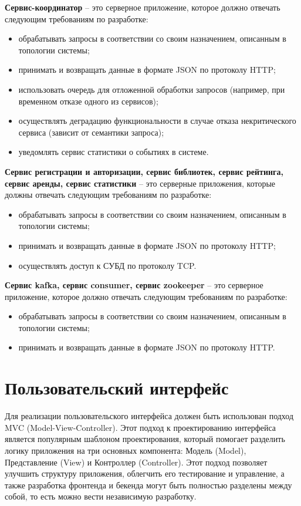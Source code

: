 \textbf{Сервис-координатор} -- это серверное приложение, которое должно отвечать следующим требованиям по разработке:
  \begin{itemize}
    \item обрабатывать запросы в соответствии со своим назначением, описанным в топологии системы;
    \item принимать и возвращать данные в формате JSON по протоколу HTTP;
    \item использовать очередь для отложенной обработки запросов (например, при временном отказе одного из сервисов);
    \item осуществлять деградацию функциональности в случае отказа некритического сервиса (зависит от семантики запроса);
    \item уведомлять сервис статистики о событиях в системе.
  \end{itemize}

 \textbf{Сервис регистрации и авторизации, сервис библиотек, сервис рейтинга, сервис аренды, сервис статистики} -- это серверные приложения, которые должны отвечать следующим требованиям по разработке:
  \begin{itemize}
    \item обрабатывать запросы в соответствии со своим назначением, описанным в топологии системы;
    \item принимать и возвращать данные в формате JSON по протоколу HTTP;
    \item осуществлять доступ к СУБД по протоколу TCP.
  \end{itemize}

\textbf{Сервис kafka, сервис consumer, сервис zookeeper} -- это серверное приложение, которое должно отвечать следующим требованиям по разработке:
  \begin{itemize}
    \item обрабатывать запросы в соответствии со своим назначением, описанным в топологии системы;
    \item принимать и возвращать данные в формате JSON по протоколу HTTP.
  \end{itemize}


\section{Пользовательский интерфейс}
Для реализации пользовательского интерфейса должен быть использован подход MVC (Model-View-Controller). Этот подход к проектированию интерфейса является популярным шаблоном проектирования, который помогает разделить логику приложения на три основных компонента: Модель (Model), Представление (View) и Контроллер (Controller). Этот подход позволяет улучшить структуру приложения, облегчить его тестирование и управление, а также разработка фронтенда и бекенда могут быть полностью разделены между собой, то есть можно вести независимую разработку.

